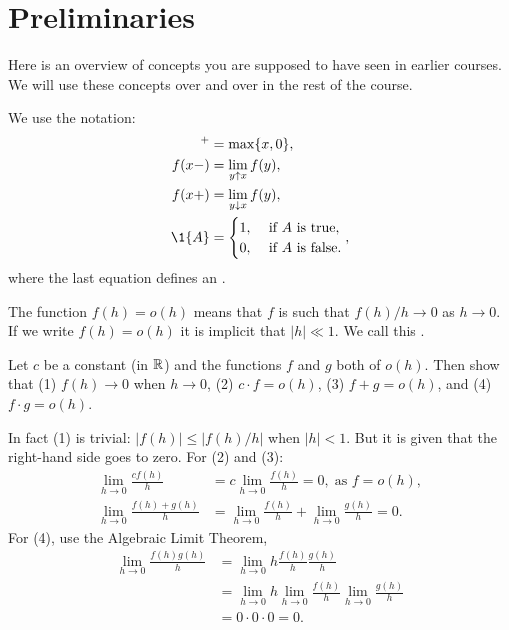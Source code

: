 \section{Preliminaries}
\label{sec:preliminaries}




Here is an overview of concepts you are supposed to have seen in earlier courses.
We will use these concepts over and over in the rest of the course.


We use the notation:
 \begin{align*}
 [x]^+ &= \max\{x, 0\}, \\
 f(x-) &= \lim_{y\uparrow x} f(y),\\
 f(x+) &= \lim_{y\downarrow x} f(y),\\
 \1{A} &=
 \begin{cases}
 1, & \text{ if $A$ is true}, \\
 0, & \text{ if $A$ is false}.
 \end{cases}, 
\end{align*}
where the last equation defines an .


The function $f(h)=o(h)$ means that $f$ is such that $f(h)/h \to 0$ as $h\to 0$.
If we write $f(h) = o(h)$ it is implicit that $|h| \ll 1$.
We call this .
\begin{exercise}
 Let $c$ be a constant (in $\mathbb{R}$) and the functions $f$ and $g$ both of $o(h)$. Then show that (1) $f(h) \to 0$ when $h\to 0$, (2) $c\cdot f = o(h)$, (3) $f+g=o(h)$, and (4) $f\cdot g=o(h)$. 
\begin{solution}
 In fact (1) is trivial: $|f(h)| \leq |f(h)/h|$ when $|h| < 1$.
 But it is given that the right-hand side goes to zero.
 For (2) and (3):
\begin{align*}
\lim_{h\to 0} \frac{c f(h)}{h} &= c \lim_{h\to 0} \frac{f(h)}{h} = 0, \; \text{as } f = o(h), \\
\lim_{h\to 0} \frac{f(h) + g(h)} h &= \lim_{h\to 0} \frac{f(h)} h + \lim_{h\to 0} \frac{g(h)} h = 0.
\end{align*}
For (4), use the Algebraic Limit Theorem,
\begin{align*}
\lim_{h\to 0} \frac{f(h)g(h)}{h} &= \lim_{h\to 0} h \frac{f(h)}{h} \frac{g(h)}{h} \\
&= \lim_{h\to 0} h \lim_{h\to 0} \frac{f(h)}{h} \lim_{h\to 0} \frac{g(h)}{h} \\
&= 0 \cdot 0 \cdot 0 = 0.
\end{align*}
\end{solution}
\end{exercise}


